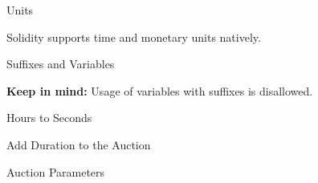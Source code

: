 \documentclass[]{beamer}
\begin{document}
\begin{frame}{Units}

Solidity supports time and monetary units natively.


\vspace{1.5em}


\end{frame}

\begin{frame}{Suffixes and Variables}

\textbf{Keep in mind:} Usage of variables with suffixes is disallowed.

\vspace{1.5em}
\begin{samplecode}{Hours to Seconds}
	
\end{samplecode}

\end{frame}


\begin{frame}{Add Duration to the Auction}

\begin{samplecode}{Auction Parameters}
	
\end{samplecode} 
	
\end{frame}
\end{document}
